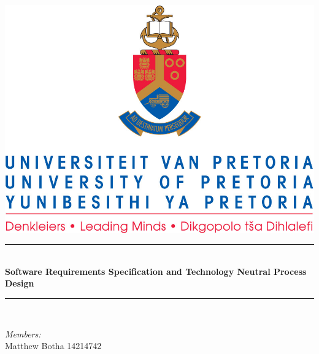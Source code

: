 \documentclass{article}
\begin{document}
	
\begin{titlepage}
	\newcommand{\HRule}{\rule{\linewidth}{0.5mm}} %

	\center %
	 

	\includegraphics[width=\textwidth]{front-page}


	\HRule \\[0.4cm]
	{ \huge \bfseries Software Requirements Specification
	and
	Technology Neutral Process Design}\\[0.4cm] %
	\HRule \\[1.5cm]
	 

	\begin{minipage}{0.4\textwidth}
	\begin{flushleft} \large
	\emph{Members:}\\%
	Matthew Botha 14214742


\end{flushleft}
\end{minipage}
\end{titlepage}
\end{document}
